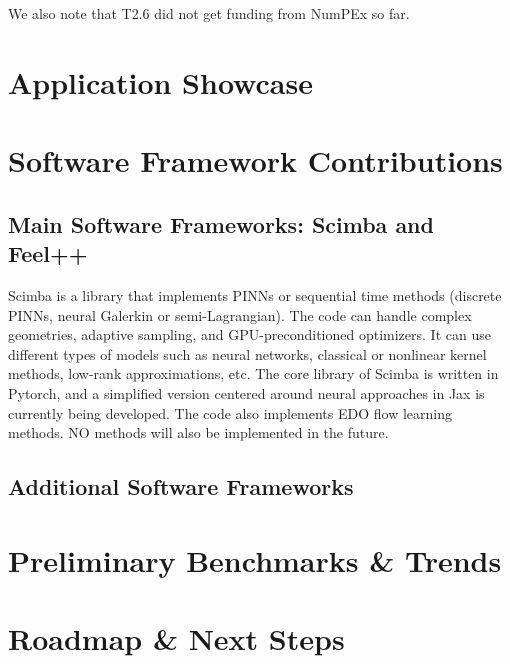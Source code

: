 We also note that T2.6  did not get funding from NumPEx so far.

\section{Application Showcase}
%   

\section{Software Framework Contributions}

\subsection{Main Software Frameworks: Scimba and Feel++}

Scimba is a  library that implements PINNs or  sequential time methods
(discrete PINNs,  neural Galerkin  or semi-Lagrangian).  The  code can
handle complex  geometries, adaptive sampling,  and GPU-preconditioned
optimizers.   It can  use different  types  of models  such as  neural
networks,   classical   or    nonlinear   kernel   methods,   low-rank
approximations,  etc.   The  core  library of  Scimba  is  written  in
Pytorch, and a simplified version centered around neural approaches in
Jax is  currently being developed.  The code also implements  EDO flow
learning methods.  NO methods will also be implemented in the future.

\subsection{Additional Software Frameworks}

\section{Preliminary Benchmarks \& Trends}

\section{Roadmap \& Next Steps}
